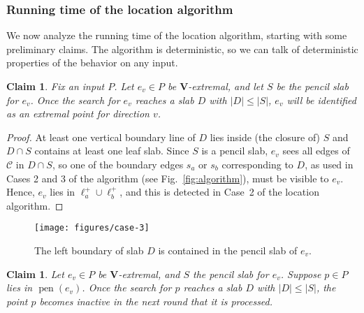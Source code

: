 \documentclass[letterpaper,11pt]{article}
\newtheorem{claim}[theorem]{Claim}
\DeclareMathOperator{\pen}{pen}
\newcommand{\cC}{\mathcal{C}}
\begin{document}
\subsubsection{Running time of the location algorithm}

We now analyze the running time of 
the location algorithm, starting
with some preliminary claims.
The algorithm is deterministic, so 
we can talk of deterministic 
properties of the behavior on any input.

\begin{claim}\label{clm:algoext} 
  Fix an input $P$. Let
  $e_v \in P$ be $\textbf{V}$-extremal,
  and let $S$ be the pencil
  slab for $e_v$. Once the 
  search for $e_v$ reaches a slab $D$ 
  with $|D| \leq |S|$, 
  $e_v$ will be identified as an extremal point 
  for direction $v$.
\end{claim}

\begin{proof} 
At least one vertical boundary 
line of $D$ lies inside (the 
closure of) $S$ and 
$D \cap S$ contains at least 
one leaf slab. Since $S$ is a 
pencil slab, $e_v$ sees all edges 
of $\cC$ in $D \cap S$, so one of 
the boundary edges $s_a$ or $s_b$ 
corresponding to $D$, as used in 
Cases 2 and 3 of the algorithm 
(see Fig.~\ref{fig:algorithm}), must
be visible to $e_v$. 
Hence, $e_v$ lies in 
$\ell_a^+ \cup \ell_b^+$, and
this is detected in Case~2 
of the location algorithm.
\end{proof}


\begin{figure}
  \centering
  \texttt{[image: figures/case-3]}
  \caption{The left boundary of slab $D$ is 
    contained in the pencil slab of $e_v$.}
  \label{fig:case-3}
\end{figure}

\begin{claim}\label{clm:algo-inact} 
  Let $e_v \in P$ be 
  $\textbf{V}$-extremal, and 
  $S$ the pencil slab for $e_v$.
  Suppose $p \in P$ lies in 
  $\pen(e_v)$. Once
  the search for $p$ reaches 
  a slab $D$ with $|D| \leq |S|$,
  the point $p$ becomes inactive  
  in the next round that it is 
  processed.
\end{claim}
\end{document}

